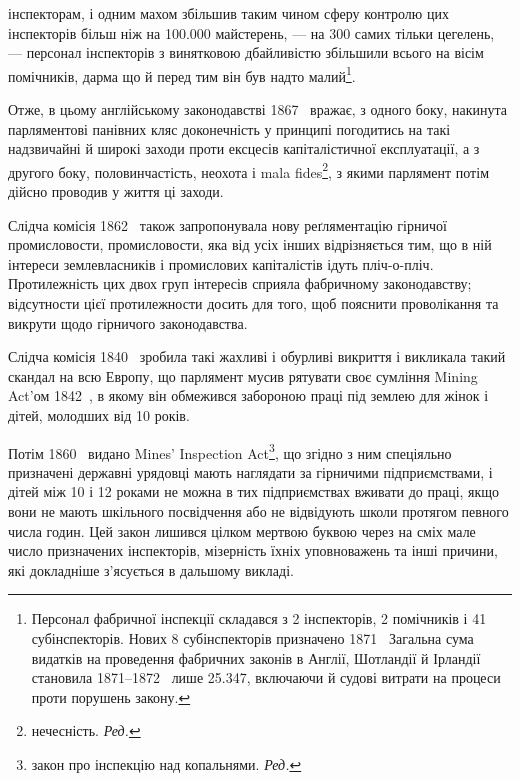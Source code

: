 \parcont{}  %
інспекторам, і одним махом збільшив таким чином сферу контролю
цих інспекторів більш ніж на \num{100.000} майстерень, — на 300 самих
тільки цегелень, — персонал інспекторів з винятковою дбайливістю
збільшили всього на вісім помічників, дарма що й перед
тим він був надто малий\footnote{
Персонал фабричної інспекції складався з 2 інспекторів, 2 помічників
і 41 субінспекторів. Нових 8 субінспекторів призначено 1871~
Загальна сума видатків на проведення фабричних законів в Англії,
Шотландії й Ірландії становила 1871--1872~ лише \num{25.347},
включаючи й судові витрати на процеси проти порушень закону.
}.

Отже, в цьому англійському законодавстві 1867~ вражає,
з одного боку, накинута парляментові панівних кляс доконечність
у принципі погодитись на такі надзвичайні й широкі заходи
проти ексцесів капіталістичної експлуатації, а з другого боку,
половинчастість, неохота і mala fides\footnote*{
нечесність. \emph{Ред.}
}, з якими парлямент
потім дійсно проводив у життя ці заходи.

Слідча комісія 1862~ також запропонувала нову реґляментацію
гірничої промисловости, промисловости, яка від усіх інших
відрізняється тим, що в ній інтереси землевласників і промислових
капіталістів ідуть пліч-о-пліч. Протилежність цих двох
груп інтересів сприяла фабричному законодавству; відсутности
цієї протилежности досить для того, щоб пояснити проволікання
та викрути щодо гірничого законодавства.

Слідча комісія 1840~ зробила такі жахливі і обурливі викриття
і викликала такий скандал на всю Европу, що парлямент
мусив рятувати своє сумління Mining Act’ом 1842~, в якому
він обмежився забороною праці під землею для жінок і дітей,
молодших від 10 років.

Потім 1860~ видано Mines’ Inspection Act\footnote*{
закон про інспекцію над копальнями. \emph{Ред.}
}, що згідно з ним
спеціяльно призначені державні урядовці мають наглядати за гірничими
підприємствами, і дітей між 10 і 12 роками не можна в
тих підприємствах вживати до праці, якщо вони не мають шкільного
посвідчення або не відвідують школи протягом певного
числа годин. Цей закон лишився цілком мертвою буквою через
на сміх мале число призначених інспекторів, мізерність їхніх
уповноважень та інші причини, які докладніше з’ясується в
дальшому викладі.

